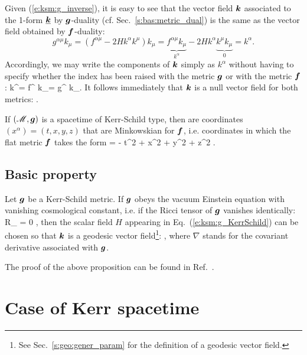Given (\ref{e:ksm:g_inverse}), it is easy to see that the vector field
$\bm{k}$ associated
to the 1-form $\underline{\bm{k}}$ by $\bm{g}$-duality (cf. Sec.~\ref{s:bas:metric_dual})
is the same as the vector field
obtained by $\bm{f}$-duality:
\[
    g^{\alpha\mu} k_\mu = (f^{\alpha\mu} - 2 H k^\alpha k^\mu) k_\mu
                        = \underbrace{f^{\alpha\mu} k_\mu}_{k^\alpha}
                          - 2H k^\alpha \underbrace{k^\mu k_\mu}_{0}
                        = k^\alpha .
\]
Accordingly, we may write the components of $\bm{k}$ simply as $k^\alpha$
without having to specify whether the index has been raised with the
metric $\bm{g}$ or with the metric $\bm{f}$:
\be
    k^\alpha = f^{\alpha\mu} k_\mu  = g^{\alpha\mu} k_\mu .
\ee
It follows immediately that $\bm{k}$ is a null vector field for
both metrics:
\be
   .
\ee


If $(\mathscr{M},\bm{g})$ is a spacetime of Kerr-Schild type, then 
are coordinates $(x^\alpha) = (t,x,y,z)$ that are Minkowskian
for $\bm{f}$, i.e. coordinates in which the flat metric
$\bm{f}$ takes the form
\be \label{e:ksm:ds_eta}
     = - \dd t^2 + \dd x^2 + \dd y^2 + \dd z^2 .
\ee

\subsection{Basic property}

\begin{greybox}
Let $\bm{g}$ be a Kerr-Schild metric.
If $\bm{g}$ obeys the vacuum Einstein
equation with vanishing cosmological constant,
i.e. if the Ricci tensor of $\bm{g}$ vanishes identically:
\be
    R_{\alpha\beta} = 0 ,
\ee
then the scalar field $H$ appearing in Eq.~(\ref{e:ksm:g_KerrSchild})
can be chosen so that $\bm{k}$ is a geodesic vector field\footnote{See Sec.~\ref{s:geo:gener_param} for the definition of a geodesic vector field.}:
\be \label{e:ksm:k_geodesic}
    ,
\ee
where $\nabla$ stands for the covariant derivative associated with $\bm{g}$.
\end{greybox}

The proof of the above proposition can be found in Ref.~\cite{KerrS65}.



\section{Case of Kerr spacetime}

